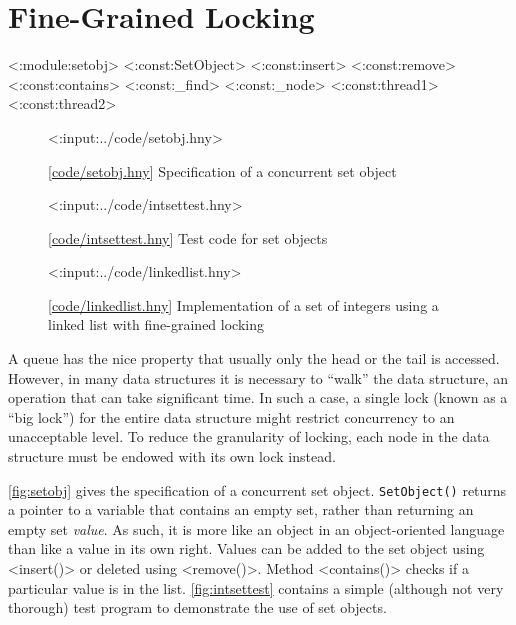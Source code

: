 \documentclass{report}
\newcommand{\harmonylink}[1]{%
[\href{https://harmony.cs.cornell.edu/#1}{\underline{#1}}]%
}
\newenvironment{code}{
\tcolorbox
}{
\endtcolorbox
}
\begin{document}
\chapter{Fine-Grained Locking}
\label{ch:finegrained}

<{:module:setobj}>
<{:const:SetObject}>
<{:const:insert}>
<{:const:remove}>
<{:const:contains}>
<{:const:_find}>
<{:const:_node}>
<{:const:thread1}>
<{:const:thread2}>

\begin{figure}
\begin{code}
<{:input:../code/setobj.hny}>
\end{code}
\caption{\harmonylink{code/setobj.hny} Specification of a concurrent
set object}
\label{fig:setobj}
\end{figure}

\begin{figure}
\begin{code}
<{:input:../code/intsettest.hny}>
\end{code}
\caption{\harmonylink{code/intsettest.hny} Test code for set objects}
\label{fig:intsettest}
\end{figure}

\begin{figure}
\begin{code}
<{:input:../code/linkedlist.hny}>
\end{code}
\caption{\harmonylink{code/linkedlist.hny} Implementation of a set of integers using a linked list with fine-grained locking}
\label{fig:linkedlist}
\end{figure}

%
%
%
%
A queue has the nice property that usually only the head or the tail is accessed.
However, in many data structures it is necessary to ``walk'' the data structure,
an operation that can take significant time.
In such a case, a single lock (known as a ``big lock'')
for the entire data structure might restrict concurrency to an unacceptable level.
To reduce the granularity of locking, each node in the data structure must be
endowed with its own lock instead.

\autoref{fig:setobj} gives the specification of a concurrent set object.
\texttt{SetObject()} returns a pointer to a variable that
contains an empty set, rather than returning an empty set \emph{value}.
As such, it is more like an object in an object-oriented language than
like a value in its own right.
Values can be added to the set object using
<{insert()}> or deleted using <{remove()}>.
Method <{contains()}> checks if a particular value is in the list.
\autoref{fig:intsettest} contains a simple (although not very thorough)
test program to demonstrate the use of set objects.
\end{document}
